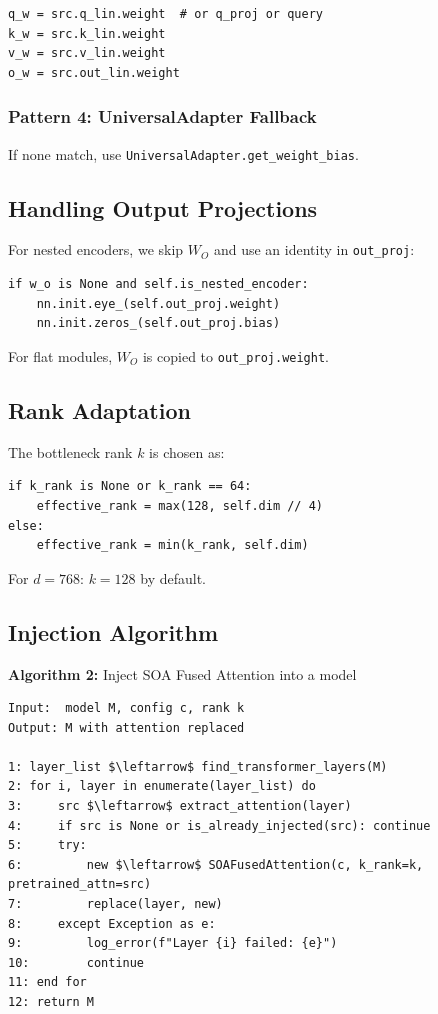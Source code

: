 \begin{lstlisting}
q_w = src.q_lin.weight  # or q_proj or query
k_w = src.k_lin.weight
v_w = src.v_lin.weight
o_w = src.out_lin.weight
\end{lstlisting}

\subsubsection{Pattern 4: UniversalAdapter Fallback}

If none match, use \texttt{UniversalAdapter.get\_weight\_bias}.

\subsection{Handling Output Projections}

For nested encoders, we skip $W_O$ and use an identity in \texttt{out\_proj}:

\begin{lstlisting}
if w_o is None and self.is_nested_encoder:
    nn.init.eye_(self.out_proj.weight)
    nn.init.zeros_(self.out_proj.bias)
\end{lstlisting}

For flat modules, $W_O$ is copied to \texttt{out\_proj.weight}.

\subsection{Rank Adaptation}

The bottleneck rank $k$ is chosen as:

\begin{lstlisting}
if k_rank is None or k_rank == 64:
    effective_rank = max(128, self.dim // 4)
else:
    effective_rank = min(k_rank, self.dim)
\end{lstlisting}

For $d = 768$: $k = 128$ by default.

\subsection{Injection Algorithm}

\textbf{Algorithm 2:} Inject SOA Fused Attention into a model
\begin{lstlisting}
Input:  model M, config c, rank k
Output: M with attention replaced

1: layer_list $\leftarrow$ find_transformer_layers(M)
2: for i, layer in enumerate(layer_list) do
3:     src $\leftarrow$ extract_attention(layer)
4:     if src is None or is_already_injected(src): continue
5:     try:
6:         new $\leftarrow$ SOAFusedAttention(c, k_rank=k, pretrained_attn=src)
7:         replace(layer, new)
8:     except Exception as e:
9:         log_error(f"Layer {i} failed: {e}")
10:        continue
11: end for
12: return M
\end{lstlisting}

